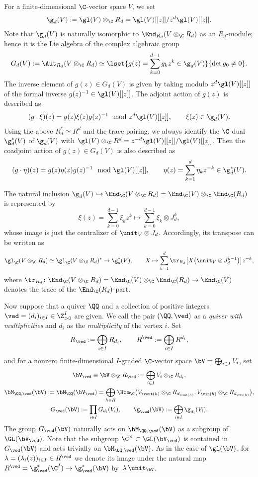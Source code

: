 For a f\/inite-dimensional $\C$-vector space $V$, we set
\[
\g_d(V) :=
\gl(V) \otimes_\C R_d = \gl(V)[[z]]/z^d \gl(V)[[z]].
\]
Note that $\g_d(V)$ is naturally isomorphic to
$\End_{R_d}(V \otimes_\C R_d)$ as an $R_d$-module;
hence it is the Lie algebra of the complex algebraic group
\[
G_d(V) := \Aut_{R_d}(V \otimes_\C R_d) \simeq
\lset{g(z) = \sum_{k=0}^{d-1}g_k z^k \in \g_d(V)}{\det g_0 \neq 0}.
\]
The inverse element of $g(z) \in G_d(V)$ is given by
taking modulo $z^d \gl(V)[[z]]$ of
the formal inverse $g(z)^{-1} \in \gl(V)[[z]]$.
The adjoint action of $g(z)$ is described as
\[
(g \cdot \xi)(z)= g(z)\xi(z)g(z)^{-1} \mod z^d \gl(V)[[z]],
\qquad \xi(z) \in \g_d(V).
\]
Using the above $R_d^* \simeq R^d$ and the trace pairing,
we always identify the $\C$-dual $\g_d^*(V)$ of $\g_d(V)$ with
$\gl(V) \otimes_\C R^d = z^{-d}\gl(V)[[z]]/\gl(V)[[z]]$.
Then the coadjoint action of $g(z) \in G_d(V)$ is also described as
\[
(g \cdot \eta)(z)= g(z)\eta(z)g(z)^{-1} \mod \gl(V)[[z]],
\qquad \eta(z)=\sum_{k=1}^d \eta_k z^{-k} \in \g^*_d(V).
\]

The natural inclusion
$\g_d(V) \hookrightarrow \End_\C(V \otimes_\C R_d)
=\End_\C(V) \otimes_\C \End_\C(R_d)$ is represented by
\[
\xi(z)=\sum_{k=0}^{d-1} \xi_k z^k \longmapsto
\sum_{k=0}^{d-1} \xi_k \otimes J_d^k,
\]
whose image is just the centralizer of $\unit_V \otimes J_d$.
Accordingly, its transpose
can be written as
\[
\gl_\C(V \otimes_\C R_d) \simeq \gl_\C (V \otimes_\C R_d)^*
\to \g_d^*(V),\qquad
X \mapsto \sum_{k=1}^d \tr_{R_d}
\bigl[ X \big(\unit_V \otimes J_d^{k-1}\big) \bigr]  z^{-k},
\]
where $\tr_{R_d} \colon \End_\C(V \otimes_\C R_d)
= \End_\C(V)\otimes_\C \End_\C(R_d) \to \End_\C(V)$
denotes the trace of the $\End_\C(R_d)$-part.

Now suppose that a quiver $\QQ$
and a collection of positive integers $\ved =(d_i)_{i \in I} \in \Z_{>0}^I$
are given.
We call the pair $(\QQ,\ved)$ as a {\em quiver with multiplicities}
and $d_i$ as the {\em multiplicity} of the vertex $i$.
Set
\[
R_\ved := \bigoplus_{i \in I} R_{d_i}, \qquad
R^\ved := \bigoplus_{i \in I} R^{d_i},
\]
and for a nonzero f\/inite-dimensional $I$-graded $\C$-vector space
$\bV=\bigoplus_{i \in I} V_i$,
set
\begin{gather*}
\bV_\ved \equiv \bV \otimes_\C R_\ved
:= \bigoplus_{i \in I} V_i \otimes_\C R_{d_i}, \\
\bM_{\QQ,\ved}(\bV) := \bM_\QQ(\bV_\ved)
= \bigoplus_{h\in H}
\Hom_\C \big(V_{\vout(h)} \otimes_\C R_{d_{\vout(h)}},
V_{\vin(h)} \otimes_\C R_{d_{\vin(h)}}\big), \\
G_\ved(\bV) := \prod_{i \in I} G_{d_i}(V_i), \qquad
\g_\ved(\bV):= \bigoplus_{i \in I} \g_{d_i}(V_i).
\end{gather*}
The group $G_\ved(\bV)$ naturally acts on $\bM_{\QQ,\ved}(\bV)$ as a
subgroup of $\GL(\bV_\ved)$.
Note that the subgroup
$\C^\times \subset \GL(\bV_\ved)$
is contained in $G_\ved(\bV)$ and acts trivially on $\bM_{\QQ,\ved}(\bV)$.
As in the case of $\gl(\bV)$,
for $\lambda =(\lambda_i(z))_{i \in I} \in R^\ved$
we denote its image under the natural map
$R^\ved=\g^*_\ved(\C^I) \to \g^*_\ved(\bV)$
by~$\lambda\,\unit_\bV$.

